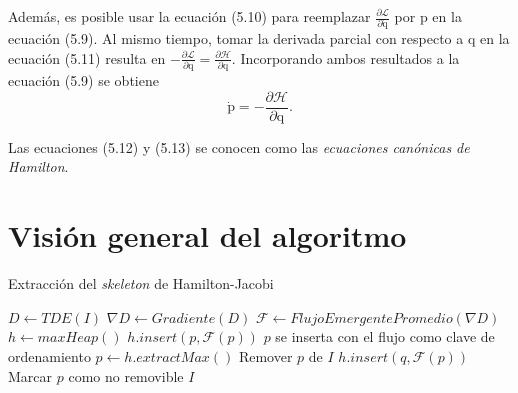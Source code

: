 \noindent
Además, es posible usar la ecuación (5.10) para reemplazar $\frac{\partial \mathcal{L}}{\partial \boldsymbol{\dot{\mathrm{q}}}}$ por $\boldsymbol{\mathrm{p}}$ en la ecuación (5.9). Al mismo tiempo, tomar la derivada parcial con respecto a $\boldsymbol{\mathrm{q}}$ en la ecuación (5.11) resulta en $-\frac{\partial \mathcal{L}}{\partial \boldsymbol{\mathrm{q}}} = \frac{\partial \mathcal{H}}{\partial \boldsymbol{\mathrm{q}}}$. Incorporando ambos resultados a la ecuación (5.9) se obtiene
\begin{equation}
\boldsymbol{\dot{\mathrm{p}}} = -\frac{\partial \mathcal{H}}{\partial \boldsymbol{\mathrm{q}}}.
\end{equation}

\noindent
Las ecuaciones (5.12) y (5.13) se conocen como las \textit{ecuaciones canónicas de Hamilton}. 

\subsection{}

\section{Visión general del algoritmo}

\begin{algorithm}[H]
\caption{Extracción del \textit{skeleton} de Hamilton-Jacobi}
\label{alg:hjskel}
\begin{algorithmic}[1]
	\State $D \gets TDE(I)$
    \State $\nabla D \gets Gradiente(D)$
    \State $\mathcal{F} \gets FlujoEmergentePromedio(\nabla D)$
    \State $h \gets maxHeap()$
        	\State $h.insert(p, \mathcal{F}(p))$ \Comment $p$ se inserta con el flujo como clave de ordenamiento
        \EndIf
    \EndFor
    	\State $p \gets h.extractMax()$
            	\State Remover $p$ de $I$
                    	\State $h.insert(q, \mathcal{F}(p))$
                    \EndIf
                \EndFor
            \Else
            	\State Marcar $p$ como no removible
            \EndIf
        \EndIf
    \EndWhile
    \State \Return $I$
\EndFunction
\end{algorithmic}
\end{algorithm}

